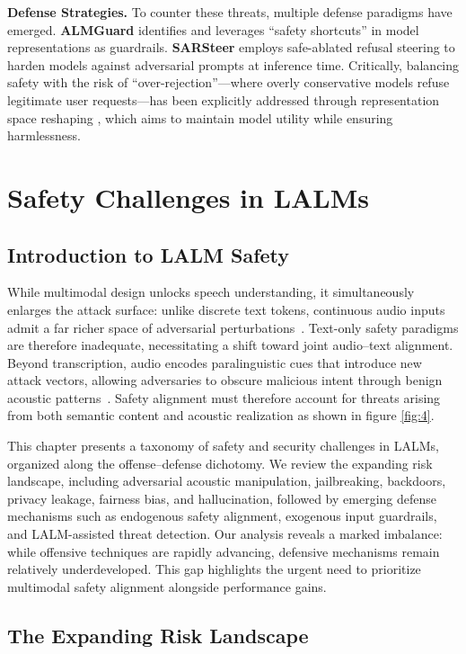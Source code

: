 \documentclass{llmxive}
\begin{document}
\textbf{Defense Strategies.} To counter these threats, multiple defense paradigms have emerged. \textbf{ALMGuard} \cite{jin2025almguard} identifies and leverages ``safety shortcuts'' in model representations as guardrails. \textbf{SARSteer} \cite{lin2025sarsteer} employs safe-ablated refusal steering to harden models against adversarial prompts at inference time. Critically, balancing safety with the risk of ``over-rejection''---where overly conservative models refuse legitimate user requests---has been explicitly addressed through representation space reshaping \cite{yang2025reshaping}, which aims to maintain model utility while ensuring harmlessness.
\section{Safety Challenges in LALMs}
\subsection{Introduction to LALM Safety}

While multimodal design unlocks speech understanding, it simultaneously enlarges the attack surface: unlike discrete text tokens, continuous audio inputs admit a far richer space of adversarial perturbations~\cite{cheng2025jailbreak}.
Text-only safety paradigms are therefore inadequate, necessitating a shift toward joint audio--text alignment. Beyond transcription, audio encodes paralinguistic cues that introduce new attack vectors, allowing adversaries to obscure malicious intent through benign acoustic patterns~\cite{sadasivan2025attacker}. Safety alignment must therefore account for threats arising from both semantic content and acoustic realization as shown in figure \ref{fig:4}.

This chapter presents a taxonomy of safety and security challenges in LALMs, organized along the offense--defense dichotomy. We review the expanding risk landscape, including adversarial acoustic manipulation, jailbreaking, backdoors, privacy leakage, fairness bias, and hallucination, followed by emerging defense mechanisms such as endogenous safety alignment, exogenous input guardrails, and LALM-assisted threat detection. Our analysis reveals a marked imbalance: while offensive techniques are rapidly advancing, defensive mechanisms remain relatively underdeveloped. This gap highlights the urgent need to prioritize multimodal safety alignment alongside performance gains.


\subsection{The Expanding Risk Landscape}
\end{document}
